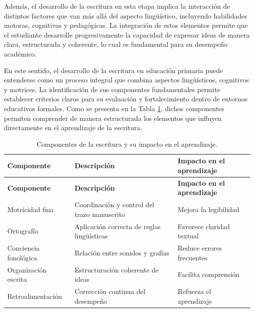 Además, el desarrollo de la escritura en esta etapa implica la interacción de distintos factores que van más allá del aspecto lingüístico, incluyendo habilidades motoras, cognitivas y pedagógicas. La integración de estos elementos permite que el estudiante desarrolle progresivamente la capacidad de expresar ideas de manera clara, estructurada y coherente, lo cual es fundamental para su desempeño académico.

En este sentido, el desarrollo de la escritura en educación primaria puede entenderse como un proceso integral que combina aspectos lingüísticos, cognitivos y motrices. La identificación de sus componentes fundamentales permite establecer criterios claros para su evaluación y fortalecimiento dentro de entornos educativos formales. Como se presenta en la Tabla \ref{tab:componentes}, dichos componentes permiten comprender de manera estructurada los elementos que influyen directamente en el aprendizaje de la escritura.


\begin{longtable}{|p{3.5cm}|p{5cm}|p{4.5cm}|}
\caption{Componentes de la escritura y su impacto en el aprendizaje.}
\label{tab:componentes} \\

\hline
\textbf{Componente} & 
\textbf{Descripción} & 
\textbf{Impacto en el aprendizaje} \\
\hline
\endfirsthead

\hline
\textbf{Componente} & 
\textbf{Descripción} & 
\textbf{Impacto en el aprendizaje} \\
\hline
\endhead

\hline
\endfoot

Motricidad fina & Coordinación y control del trazo manuscrito & Mejora la legibilidad \\
\hline

Ortografía & Aplicación correcta de reglas lingüísticas & Favorece claridad textual \\
\hline

Conciencia fonológica & Relación entre sonidos y grafías & Reduce errores frecuentes \\
\hline

Organización escrita & Estructuración coherente de ideas & Facilita comprensión \\
\hline

Retroalimentación & Corrección continua del desempeño & Refuerza el aprendizaje \\
\hline

\end{longtable}

